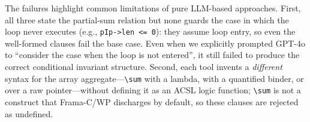 \DIFaddbegin
The failures highlight common limitations of pure LLM-based approaches. First, all three state the partial-sum relation but none guards the case in which the loop never executes (e.g., \texttt{pIp->len <= 0}): they assume loop entry, so even the well-formed clauses fail the base case. Even when we explicitly prompted GPT-4o to ``consider the case when the loop is not entered'', it still failed to produce the correct conditional invariant structure. Second, each tool invents a \emph{different} syntax for the array aggregate---\texttt{\textbackslash sum} with a lambda, with a quantified binder, or over a raw pointer---without defining it as an ACSL logic function; \texttt{\textbackslash sum} is not a construct that Frama-C/WP discharges by default, so these clauses are rejected as undefined.
\DIFaddend
 

 

 


 
